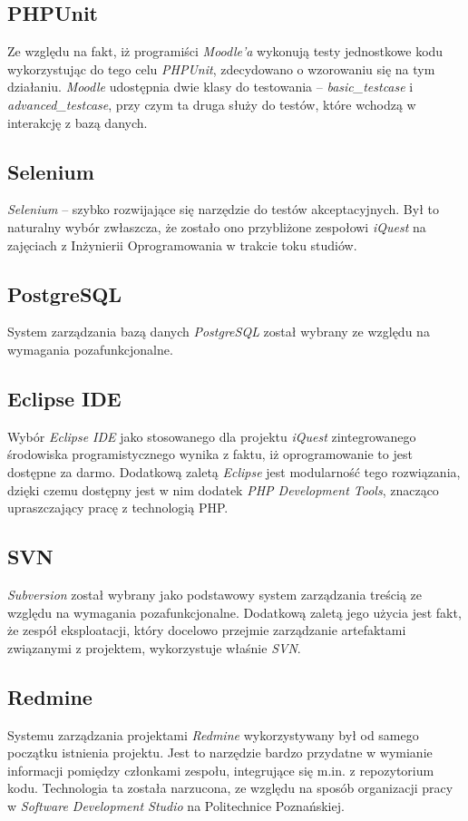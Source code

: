 \subsection{PHPUnit}
Ze względu na fakt, iż programiści \textit{Moodle'a} wykonują testy jednostkowe kodu wykorzystując do tego celu \emph{PHPUnit}, zdecydowano o wzorowaniu się na tym działaniu. \textit{Moodle} udostępnia dwie klasy do testowania -- \textit{basic\_testcase} i \textit{advanced\_testcase}, przy czym ta druga służy do testów, które wchodzą w interakcję z bazą danych.

\subsection{Selenium}
\emph{Selenium} -- szybko rozwijające się narzędzie do testów akceptacyjnych. Był to naturalny wybór zwłaszcza, że zostało ono przybliżone zespołowi \textit{iQuest} na zajęciach z Inżynierii Oprogramowania w trakcie toku studiów.

\subsection{PostgreSQL}
System zarządzania bazą danych \emph{PostgreSQL} został wybrany ze względu na wymagania pozafunkcjonalne.

\subsection{Eclipse IDE}
Wybór \emph{Eclipse IDE} jako stosowanego dla projektu \textit{iQuest} zintegrowanego środowiska programistycznego wynika z faktu, iż oprogramowanie to jest dostępne za darmo. Dodatkową zaletą \textit{Eclipse} jest modularność tego rozwiązania, dzięki czemu dostępny jest w nim dodatek \emph{PHP Development Tools}, znacząco upraszczający pracę z technologią PHP.

\subsection{SVN}
\emph{Subversion} został wybrany jako podstawowy system zarządzania treścią ze względu na wymagania pozafunkcjonalne. Dodatkową zaletą jego użycia jest fakt, że zespół eksploatacji, który docelowo przejmie zarządzanie artefaktami związanymi z projektem, wykorzystuje właśnie \textit{SVN}.

\subsection{Redmine}
Systemu zarządzania projektami \emph{Redmine} wykorzystywany był od samego początku istnienia projektu. Jest to narzędzie bardzo przydatne w wymianie informacji pomiędzy członkami zespołu, integrujące się m.in. z repozytorium kodu. Technologia ta została narzucona, ze względu na sposób organizacji pracy w \textit{Software Development Studio} na Politechnice Poznańskiej.

